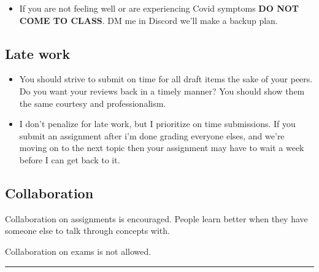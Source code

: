 \documentclass[
  letterpaper,
  DIV=11,
  numbers=noendperiod]{scrartcl}
\providecommand{\tightlist}{%
  \setlength{\itemsep}{0pt}\setlength{\parskip}{0pt}}\usepackage{longtable,booktabs,array}
\begin{document}
\begin{itemize}
\tightlist
\item
  If you are not feeling well or are experiencing Covid symptoms
  \textbf{DO NOT COME TO CLASS}. DM me in Discord we'll make a backup
  plan.
\end{itemize}

\hypertarget{late-work}{%
\subsection{Late work}\label{late-work}}

\begin{itemize}
\tightlist
\item
  You should strive to submit on time for all draft items the sake of
  your peers. Do you want your reviews back in a timely manner? You
  should show them the same courtesy and professionalism.
\item
  I don't penalize for late work, but I prioritize on time submissions.
  If you submit an assignment after i'm done grading everyone elses, and
  we're moving on to the next topic then your assignment may have to
  wait a week before I can get back to it.
\end{itemize}

\hypertarget{collaboration}{%
\subsection{Collaboration}\label{collaboration}}

Collaboration on assignments is encouraged. People learn better when
they have someone else to talk through concepts with.

\begin{tcolorbox}[enhanced jigsaw, colback=white, title=\textcolor{quarto-callout-warning-color}{\faExclamationTriangle}\hspace{0.5em}{Warning}, toptitle=1mm, bottomrule=.15mm, breakable, leftrule=.75mm, bottomtitle=1mm, opacityback=0, coltitle=black, rightrule=.15mm, left=2mm, toprule=.15mm, colframe=quarto-callout-warning-color-frame, colbacktitle=quarto-callout-warning-color!10!white, opacitybacktitle=0.6, arc=.35mm, titlerule=0mm]
Collaboration on exams is not allowed.
\end{tcolorbox}

\begin{center}\rule{0.5\linewidth}{0.5pt}\end{center}
\end{document}
